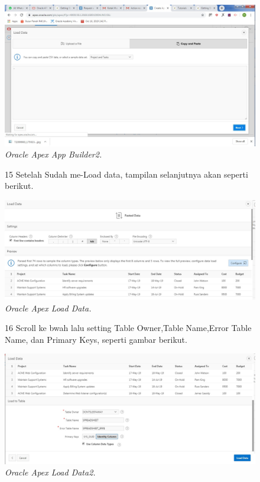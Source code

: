 \begin{enumerate}
\begin{figure}
    \begin{center}
\includegraphics[scale=0.4]{figures/login3.jpg}
    \caption{\textit{Oracle Apex App Builder2.}}
        \end{center}
\label{gambar}
\end{figure}

\begin{figure}
\item[15] Setelah Sudah me-Load data, tampilan selanjutnya akan seperti berikut.

    \begin{center}
\includegraphics[scale=0.4]{figures/login4.jpg}
    \caption{\textit{Oracle Apex Load Data.}}
        \end{center}
\label{gambar}
\end{figure}

\begin{figure}
\item[16] Scroll ke bwah lalu setting Table Owner,Table Name,Error Table Name, dan Primary Keys, seperti gambar berikut.

    \begin{center}
\includegraphics[scale=0.4]{figures/login5.jpg}
    \caption{\textit{Oracle Apex Load Data2.}}
        \end{center}
\label{gambar}
\end{figure}


\end{enumerate}
